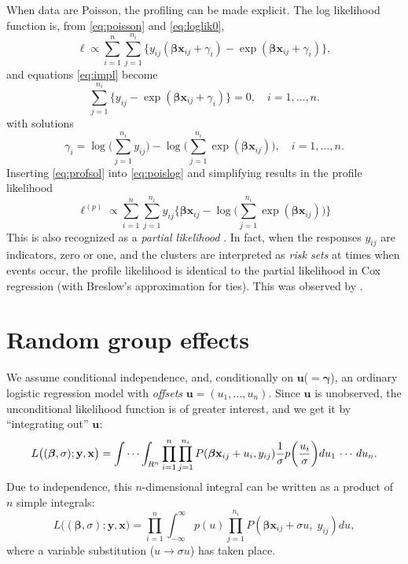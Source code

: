 \documentclass[a4paper,11pt]{article}
\newcommand{\bx}{\ensuremath{\mathbf{x}}}
\newcommand{\by}{\ensuremath{\mathbf{y}}}
\newcommand{\bu}{\ensuremath{\mathbf{u}}}
\newcommand{\bb}{\ensuremath{\boldsymbol{\beta}}}
\newcommand{\bg}{\ensuremath{\boldsymbol{\gamma}}}
\newcommand{\vect}[1]{\ensuremath{\mathbf{#1}}}
\newcommand{\py}{\ensuremath{P(\bb\bx_{ij} + u_i, y_{ij})}}
\newcommand{\Py}{\ensuremath{P(\bb\bx_{ij} + \sigma u, \; y_{ij})}}
\begin{document}
When data are Poisson, the profiling can be made explicit. The log
likelihood function is, from \eqref{eq:poisson} and \eqref{eq:loglik0},
\begin{equation}\label{eq:poislog}
\ell \propto \sum_{i=1}^n\sum_{j=1}^{n_i}\bigl\{y_{ij}(\bb\bx_{ij} + \gamma_i) -
\exp(\bb\bx_{ij} + \gamma_i)\bigr\}, 
\end{equation}
and equations \eqref{eq:impl} become
\begin{equation*}
\sum_{j=1}^{n_i} \bigl\{y_{ij} - \exp(\bb\bx_{ij} + \gamma_i)\bigr\} = 0,
\quad i = 1, \ldots, n.
\end{equation*}
with solutions
\begin{equation}\label{eq:profsol}
\gamma_i = \log\biggl(\sum_{j=1}^{n_i}y_{ij}\biggr) - \log\biggl(\sum_{j=1}^{n_i}
\exp(\bb\bx_{ij})\biggr), \quad i = 1, \ldots, n.
\end{equation}
Inserting \eqref{eq:profsol} into \eqref{eq:poislog} and simplifying
results in the profile likelihood 
\begin{equation*}%
\ell^{(p)} \propto \sum_{i=1}^n\sum_{j=1}^{n_i} y_{ij} \biggl\{\bb\bx_{ij} -
\log\biggl(\sum_{j=1}^{n_i} \exp(\bb\bx_{ij})\biggr)\biggr\}
\end{equation*}
This is also recognized as a \emph{partial likelihood} \citep{cox75}. In
fact, when the responses $y_{ij}$ are indicators, zero or one, and the
clusters are interpreted as \emph{risk sets} at times when events occur,
the profile likelihood is identical to the partial likelihood in Cox
regression (with Breslow's approximation for ties). This was observed by
\cite{joh83}. 

\section{Random group effects}
We assume conditional independence, and, conditionally on \bu ($= \bg$), an ordinary
logistic regression model with \emph{offsets} $\vect{u} = (u_1, \ldots, u_n)$. 
Since $\vect{u}$ is unobserved, the unconditional likelihood function is of
greater interest, and we get it by ``integrating out'' \vect{u}:
\begin{equation*}
L\big((\bb, \sigma); \by, \bx\big) = \idotsint_{R^n} \prod_{i = 1}^n
\prod_{j = 1}^{n_i} \py \frac{1}{\sigma}p\biggl(\frac{u_i}{\sigma}\biggr) du_1\,\cdots\,du_n.
\end{equation*}
Due to independence, this $n$-dimensional integral can be written as a
product of $n$ simple integrals:
\begin{equation}\label{eq:lik}
L\big((\bb, \sigma); \by, \bx\big) = \prod_{i = 1}^n \int_{-\infty}^{\infty} 
p(u) \prod_{j = 1}^{n_i} \Py  du,
\end{equation}
where a variable substitution ($u \rightarrow \sigma u$) has
taken place.
 
\end{document}
